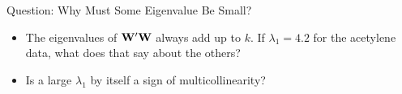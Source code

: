 

\begin{frame}{Question: Why Must Some Eigenvalue Be Small?}
    \begin{itemize}
        \item The eigenvalues of $\mathbf{W}'\mathbf{W}$ always add up to $k$. If $\lambda_1=4.2$ for the acetylene data, what does that say about the others?
        \item Is a large $\lambda_1$ by itself a sign of multicollinearity?
    \end{itemize}
\end{frame}



